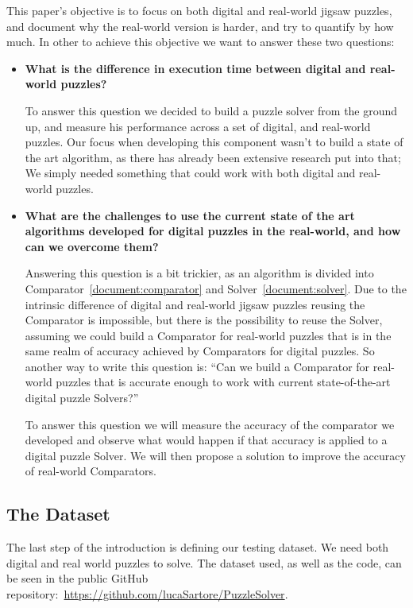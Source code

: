 \documentclass[epsfig,a4paper,11pt,titlepage,twoside,openany]{article}
\begin{document}
This paper’s objective is to focus on both digital and real-world jigsaw puzzles,
and document why the real-world version is harder, and try to quantify by how much.
In other to achieve this objective we want to answer these two questions:
\begin{itemize}
  \item \textbf{What is the difference in execution time between
                digital and real-world puzzles?}
  
  To answer this question we decided to build a puzzle solver from the ground up,
  and measure his performance across a set of digital, and real-world puzzles.
  Our focus when developing this component wasn't to build a state of the art algorithm,
  as there has already been extensive research put into that;
  We simply needed something that could work with both digital and real-world puzzles.
  
  \item \textbf{What are the challenges to use the current state of the art algorithms developed for digital
                puzzles in the real-world, and how can we overcome them?}
  
	Answering this question is a bit trickier, as an algorithm is divided into Comparator~\cref{document:comparator}
  and Solver~\cref{document:solver}. Due to the intrinsic difference of digital and real-world jigsaw puzzles
  reusing the Comparator is impossible, but there is the possibility to reuse the Solver,
  assuming we could build a Comparator for real-world puzzles that is in the same realm
  of accuracy achieved by Comparators for digital puzzles.
  So another way to write this question is: ``Can we build a Comparator for real-world
  puzzles that is accurate enough to work with current state-of-the-art  digital
  puzzle Solvers?''

	To answer this question we will measure the accuracy of the comparator we developed
  and observe what would happen if that accuracy is
  applied to a digital puzzle Solver. We will then propose a solution to improve
  the accuracy of real-world Comparators.


\end{itemize}

\subsection{The Dataset}
The last step of the introduction is defining our
testing dataset. We need both digital and real world
puzzles to solve. The dataset used, as well as
the code, can be seen in the public GitHub
repository:~\url{https://github.com/lucaSartore/PuzzleSolver}.
\label{document:dataset}
\end{document}
